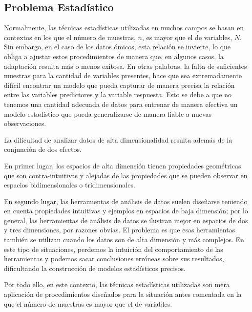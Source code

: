 \subsection{Problema Estadístico}

Normalmente, las técnicas estadísticas utilizadas en muchos campos se basan en contextos en los que 
el número de muestras, $n$, es mayor que el de variables, $N$. Sin embargo, en el caso de los datos ómicos, esta relación se invierte,
lo que obliga a ajustar estos procedimientos de manera que, en algunos casos, la adaptación resulta más o menos exitosa. En otras palabras,
la falta de suficientes muestras para la cantidad de variables presentes, hace que sea extremadamente difícil encontrar un modelo que pueda capturar
de manera precisa la relación entre las variables predictores y la variable respuesta. Esto se debe a que no tenemos una cantidad adecuada 
de datos para entrenar de manera efectiva un modelo estadístico que pueda generalizarse de manera fiable a nuevas observaciones.

La dificultad de analizar datos de alta dimensionalidad resulta además de la conjunción de dos efectos.

En primer lugar, los espacios de alta dimensión tienen propiedades geométricas que son contra-intuitivas y alejadas de las propiedades
que se pueden observar en espacios bidimensionales o tridimensionales. 

En segundo lugar, las herramientas de análisis de datos suelen diseñarse teniendo en cuenta propiedades intuitivas
y ejemplos en espacios de baja dimensión; por lo general, las herramientas de análisis de datos se ilustran mejor en espacios de dos y 
tres dimensiones, por razones obvias. El problema es que esas herramientas también se utilizan cuando los datos son de alta dimensión y
más complejos. En este tipo de situaciones, perdemos la intuición del comportamiento de las herramientas y podemos sacar conclusiones erróneas
sobre sus resultados, dificultando la construcción de modelos estadísticos precisos. \newline

Por todo ello, en este contexto, las técnicas estadísticas utilizadas son mera aplicación de procedimientos diseñados para la situación antes comentada en la 
que el número de muestras es mayor que el de variables. \newline

